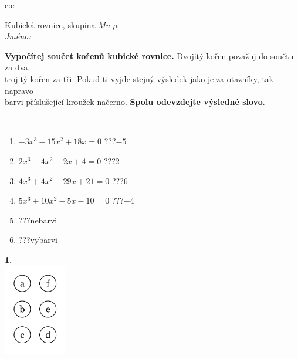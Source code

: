 \documentclass[10pt]{report}
\begin{document}
\begin{tabular}{c:c}
\begin{minipage}[c][104.5mm][t]{0.5\linewidth}
\begin{center}
\vspace{7mm}
{\huge Kubická rovnice, skupina \textit{Mu $\mu$} -}\\[5mm]
\textit{Jméno:}\phantom{xxxxxxxxxxxxxxxxxxxxxxxxxxxxxxxxxxxxxxxxxxxxxxxxxxxxxxxxxxxxxxxxx}\\[5mm]
\begin{minipage}{0.95\linewidth}
\begin{center}
\textbf{Vypočítej součet kořenů kubické rovnice.} Dvojitý kořen považuj do součtu za dva,\\trojitý kořen za tři. Pokud ti vyjde stejný výsledek jako je za otazníky, tak napravo\\barvi příslušející kroužek načerno. \textbf{Spolu odevzdejte výsledné slovo}.
\end{center}
\end{minipage}
\\[1mm]
\begin{minipage}{0.79\linewidth}
\begin{center}
\begin{varwidth}{\linewidth}
\begin{enumerate}
\Large
\item $-3x^3-15x^2+18x=0$\quad \dotfill\; ???\;\dotfill \quad $-5$
\item $2x^3-4x^2-2x+4=0$\quad \dotfill\; ???\;\dotfill \quad $2$
\item $4x^3+4x^2-29x+21=0$\quad \dotfill\; ???\;\dotfill \quad $6$
\item $5x^3+10x^2-5x-10=0$\quad \dotfill\; ???\;\dotfill \quad $-4$
\item \quad \dotfill\; ???\;\dotfill \quad nebarvi
\item \quad \dotfill\; ???\;\dotfill \quad vybarvi
\end{enumerate}
\end{varwidth}
\end{center}
\end{minipage}
\begin{minipage}{0.20\linewidth}
\begin{center}
{\Huge\bfseries 1.} \\[2mm]
\includegraphics[height=40mm]{../images/braille.png}

\end{center}
\end{minipage}
\end{center}
\end{minipage}
\end{tabular}
\end{document}
